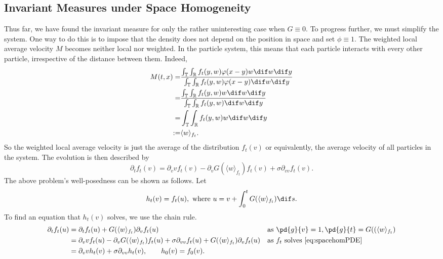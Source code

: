         \subsection{Invariant Measures under Space Homogeneity}
        Thus far, we have found the invariant measure for only the rather uninteresting case when $G \equiv 0$. To progress further, we must simplify the system. One way to do this is to impose that the density does not depend on the position in space and set $\phi \equiv 1$. The weighted local average velocity $M$ becomes neither local nor weighted. In the particle system, this means that each particle interacts with every other particle, irrespective of the distance between them. Indeed,
        \begin{align*}
            M(t,x) =&  \frac{\int_{\T}\int_{\R}f_t(y,w)\phi(x-y)w\dif w \dif y}{\int_{\T}\int_{\R}f_t(y,w)\phi(x-y)\dif w \dif y}\\
            =&  \frac{\int_{\T}\int_{\R}f_t(y,w)w\dif w \dif y}{\int_{\T}\int_{\R}f_t(y,w)\dif w \dif y}\\
            =& \int_{\T}\int_{\R}f_t(y,w)w\dif w \dif y\\
            :=& \langle w \rangle_{f_t}.
        \end{align*}
        So the weighted local average velocity is just the average of the distribution $f_t(v)$ or equivalently, the average velocity of all particles in the system. The evolution is then described by
        \begin{equation}\label{eq:spacehomPDE}
            \partial_t f_t(v) = \partial_v vf_t(v) - \partial_v G(\langle w \rangle_{f_t})f_t(v) + \sigma \partial_{vv} f_t(v).
        \end{equation}
        The above problem's well-posedness can be shown as follows. Let
        \[
            h_t(v) = f_t(u),\text{ where } u = v + \int_0^t G(\langle w\rangle_{f_t}) \dif s.
        \]
        To find an equation that $h_t(v)$ solves, we use the chain rule.
        \begin{align*}
            \partial_t f_t(u) &= \partial_t f_t(u) +  G(\langle w\rangle_{f_t})\partial_v f_t(u) && \text{as   } \pd{g}{v} = 1, \pd{g}{t} = G((\langle w\rangle_{f_t})\\
            &=\partial_v vf_t(u) - \partial_v G(\langle w \rangle_{f_t})f_t(u) + \sigma \partial_{vv} f_t(u) + G(\langle w\rangle_{f_t})\partial_v f_t(u) &&\text{as  } f_t \text{ solves } \eqref{eq:spacehomPDE}\\
            &=\partial_v vh_t(v) + \sigma \partial_{vv} h_t(v) , \qquad h_0(v) =f_0(v).
        \end{align*}

